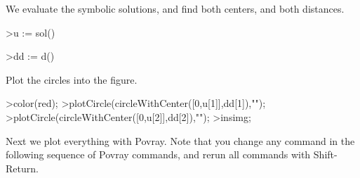 \documentclass[a4paper,10pt]{article}
\begin{document}
\begin{eulernotebook}
\begin{eulercomment}
\begin{eulercomment}
\begin{eulercomment}
\begin{eulercomment}
\begin{eulercomment}
\begin{eulercomment}
\begin{eulercomment}
We evaluate the symbolic solutions, and find both centers, and both
distances.
\end{eulercomment}
\begin{eulerprompt}
>u := sol()
\end{eulerprompt}
\begin{euleroutput}
  [0.333333,  1]
\end{euleroutput}
\begin{eulerprompt}
>dd := d()
\end{eulerprompt}
\begin{euleroutput}
  [0.149071,  0.447214]
\end{euleroutput}
\begin{eulercomment}
Plot the circles into the figure.
\end{eulercomment}
\begin{eulerprompt}
>color(red);
>plotCircle(circleWithCenter([0,u[1]],dd[1]),"");
>plotCircle(circleWithCenter([0,u[2]],dd[2]),"");
>insimg;
\end{eulerprompt}
\begin{eulercomment}
Next we plot everything with Povray. Note that you change any command in the following
sequence of Povray commands, and rerun all commands with Shift-Return.


\end{eulercomment}
\end{eulercomment}
\end{eulercomment}
\end{eulercomment}
\end{eulercomment}
\end{eulercomment}
\end{eulercomment}
\end{eulernotebook}
\end{document}
